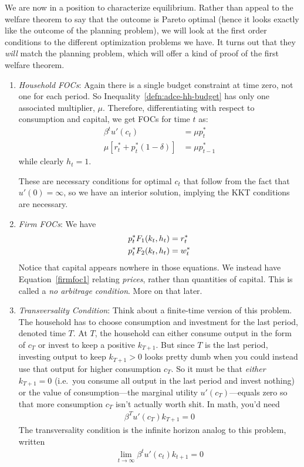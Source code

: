 \documentclass[12pt]{article}
\theoremstyle{plain}
\theoremstyle{definition}
\theoremstyle{remark}
\newcommand{\limt}{\lim_{t\rightarrow\infty}}
\begin{document}
We are now in a position to characterize equilibrium. Rather than appeal
to the welfare theorem to say that the outcome is Pareto optimal (hence
it looks exactly like the outcome of the planning problem), we will look
at the first order conditions to the different optimization problems we
have. It turns out that they \emph{will} match the planning problem,
which will offer a kind of proof of the first welfare theorem.
\begin{enumerate}
  \item \emph{Household FOCs}: Again there is a single budget
    constraint at time zero, not one for each period. So
    Inequality~\ref{defn:adce-hh-budget} has only one associated
    multiplier, $\mu$. Therefore, differentiating with respect to
    consumption and capital, we get FOCs for time $t$ as:
    \begin{align}
      \beta^t u'(c_t) &= \mu p_t^* \label{hhfoc1}\\
      \mu[r_t^* + p_t^* (1-\delta)]
      &= \mu p_{t-1}^* \label{hhfoc2}
    \end{align}
    while clearly $h_t=1$.

    These are necessary conditions for optimal $c_t$ that follow from
    the fact that $u'(0)=\infty$, so we have an interior solution,
    implying the KKT conditions are necessary.

  \item \emph{Firm FOCs}: We have
    \begin{align}
      p^*_t F_1(k_t,h_t) &= r_t^* \label{firmfoc1}\\
      p^*_t F_2(k_t,h_t) &= w_t^* \notag
    \end{align}
    Notice that capital appears nowhere in those equations.
    We instead have Equation~\ref{firmfoc1} relating \emph{prices},
    rather than quantities of capital. This is called a
    \emph{no arbitrage condition}. More on that later.

  \item \emph{Transversality Condition}:
    Think about a finite-time version of this problem. The household has
    to choose consumption and investment for the last period, denoted
    time $T$. At $T$, the household can either consume output in the
    form of $c_T$ or invest to keep a positive $k_{T+1}$. But since $T$
    is the last period, investing output to keep $k_{T+1}>0$ looks
    pretty dumb when you could instead use that output for higher
    consumption $c_T$.  So it must be that \emph{either} $k_{T+1}=0$
    (i.e.\ you consume all output in the last period and invest nothing)
    or the value of consumption---the marginal utility
    $u'(c_T)$---equals zero so that more consumption $c_T$ isn't
    actually worth shit. In math, you'd need
    \begin{align*}
      \beta^{T} u'(c_T) k_{T+1} = 0
    \end{align*}
    The transversality condition is the infinite horizon analog to this
    problem, written
    \begin{align*}
      \limt \beta^t u'(c_t) k_{t+1}=0
    \end{align*}


\end{enumerate}
\end{document}

